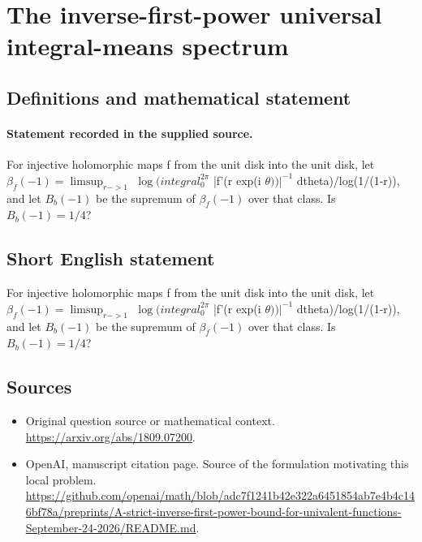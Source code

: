 \documentclass[11pt]{article}
\begin{document}
\section*{The inverse-first-power universal integral-means spectrum}\label{statement}
\subsection{Definitions and mathematical statement}
\paragraph{Statement recorded in the supplied source.}
For injective holomorphic maps f from the unit disk into the unit disk, let $\beta _f(-1)=\limsup _{r->1}$ $\log (integral_0^{2\pi }$ |f'(r exp(i $\theta ))|^{-1}$ dtheta)/log(1/(1-r)), and let $B_b(-1)$ be the supremum of $\beta _f(-1)$ over that class. Is $B_b(-1)=1/4$?
\subsection{Short English statement}
For injective holomorphic maps f from the unit disk into the unit disk, let $\beta _f(-1)=\limsup _{r->1}$ $\log (integral_0^{2\pi }$ |f'(r exp(i $\theta ))|^{-1}$ dtheta)/log(1/(1-r)), and let $B_b(-1)$ be the supremum of $\beta _f(-1)$ over that class. Is $B_b(-1)=1/4$?
\subsection{Sources}
\begin{itemize}
\item[S1] Original question source or mathematical context.
\url{https://arxiv.org/abs/1809.07200}.
\item[S2] OpenAI, manuscript citation page. Source of the formulation motivating this local problem.
\url{https://github.com/openai/math/blob/adc7f1241b42e322a6451854ab7e4b4c146bf78a/preprints/A-strict-inverse-first-power-bound-for-univalent-functions-September-24-2026/README.md}.
\end{itemize}
\end{document}
